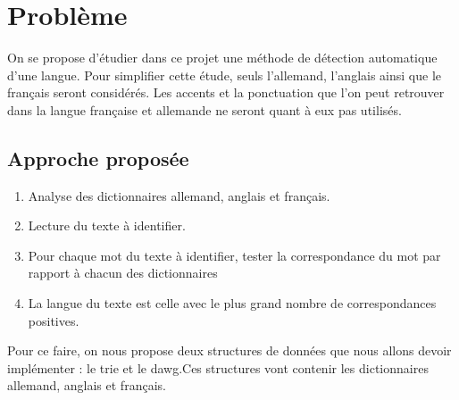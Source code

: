 \chapter*{Problème}
\label{sec:abstract}
\vspace*{-10mm}

On se propose d’étudier dans ce projet une méthode de détection automatique d’une langue.
Pour simplifier cette étude, seuls l’allemand, l’anglais ainsi que le français seront considérés. Les
accents et la ponctuation que l’on peut retrouver dans la langue française et allemande ne seront
quant à eux pas utilisés.

\section*{\color{black}Approche proposée}
\begin{enumerate}
\item Analyse des dictionnaires allemand, anglais et français.
\item Lecture du texte à identifier.
\item Pour chaque mot du texte à identifier, tester la correspondance du mot par rapport à
chacun des dictionnaires
\item La langue du texte est celle avec le plus grand nombre de correspondances positives.
\end{enumerate}

\newline Pour ce faire, on nous propose deux structures de données que nous allons devoir implémenter : le trie et le dawg.\newline Ces structures vont contenir les dictionnaires allemand, anglais et français.

